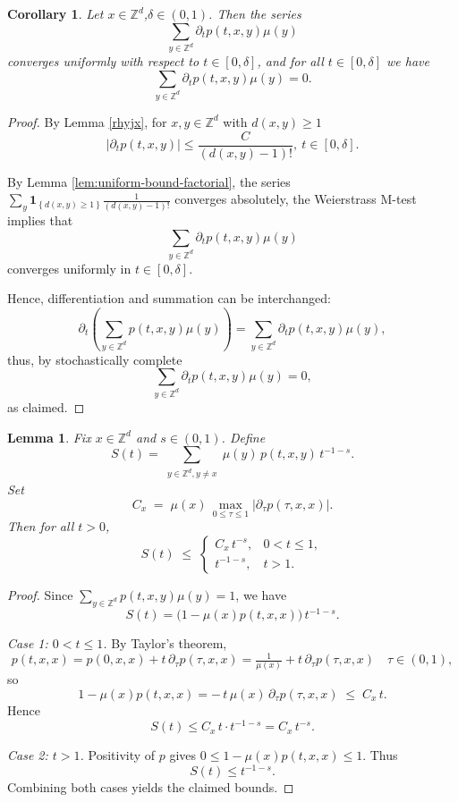 \documentclass[reqno,12pt]{amsart}
\numberwithin{equation}{section}
\newtheorem{lemma}[theorem]{Lemma}
\newtheorem{corollary}[theorem]{Corollary}
\begin{document}
\begin{corollary}\label{yzslj}
	Let \(x \in \mathbb{Z}^d\),$\delta\in (0,1)$. Then the series
	\[
	\sum_{y \in \mathbb{Z}^d} \partial_t p(t, x, y) \mu(y)
	\]
	converges uniformly with respect to \(t \in [0,\delta]\), and for all \(t \in [0,\delta]\) we have
	\[
	\sum_{y \in \mathbb{Z}^d} \partial_t p(t, x, y) \mu(y) = 0.
	\]
	
\end{corollary}


\begin{proof}
	By Lemma \ref{rhyjx}, for $x,y\in \mathbb{Z}^d$ with $d\left(x,y\right)\ge 1$
	\[
	\left| \partial_t p(t,x,y) \right| \leq \frac{C}{\left(d(x,y)-1\right)!}, \:t\in [0,\delta].
	\]
	
	By Lemma \ref{lem:uniform‐bound‐factorial}, the series \(\sum_{y} \mathbf{1}_{\left\{d\left(x,y\right)\ge 1\right\}} \frac{1}{\left(d(x,y)-1\right)!}\) converges absolutely, the Weierstrass M-test implies that
	\[
	\sum_{y\in \mathbb{Z}^d} \partial_t p(t,x,y) \mu(y)
	\]
	converges uniformly in \(t\in[0,\delta]\).
	
	Hence, differentiation and summation can be interchanged:
	\[
	\partial_t \left( \sum_{y\in\mathbb{Z}^d} p(t,x,y)\mu(y) \right) = \sum_{y\in\mathbb{Z}^d} \partial_t p(t,x,y)\mu(y),
	\]
thus, by stochastically complete
	\[
	\sum_{y\in\mathbb{Z}^d} \partial_t p(t,x,y) \mu(y) = 0,
	\]
	as claimed.
\end{proof}

\begin{lemma}\label{stupbound}
	Fix \(x\in\mathbb{Z}^d\) and \(s\in(0,1)\).  Define
	\[
	S(t)
	=\sum_{\substack{y\in\mathbb{Z}^d,y\neq x}}
	\mu(y)\,p(t,x,y)\,t^{-1-s}.
	\]
	Set
	\[
	C_x \;=\;\mu(x)\,\max_{0\le\tau\le1}\bigl|\partial_\tau p(\tau,x,x)\bigr|.
	\]
	Then for all \(t>0\),
	\[
	S(t)\;\le\;
	\begin{cases}
		C_x\,t^{-s}, &0<t\le1,\\
		t^{-1-s},    &t>1.
	\end{cases}
	\]
\end{lemma}

\begin{proof}
	Since \(\sum_{y\in\mathbb{Z}^d }p(t,x,y)\mu(y)=1\), we have
	\[
	S(t)
	=\bigl(1-\mu(x)p(t,x,x)\bigr)\,t^{-1-s}.
	\]
	
	\emph{Case 1: \(0<t\le1\).}  By Taylor’s theorem,
	\[
	p(t,x,x)
	=p(0,x,x)+t\,\partial_\tau p(\tau,x,x)
	=\tfrac1{\mu(x)}+t\,\partial_\tau p(\tau,x,x)
	\quad\tau\in(0,1),
	\]
	so
	\[
	1-\mu(x)p(t,x,x)
	=-\,t\,\mu(x)\,\partial_\tau p(\tau,x,x)
	\;\le\;C_x\,t.
	\]
	Hence
	\[
	S(t)
	\le C_x\,t\cdot t^{-1-s}
	=C_x\,t^{-s}.
	\]
	
	\emph{Case 2: \(t>1\).}  Positivity of \(p\) gives \(0\le1-\mu(x)p(t,x,x)\le1\).  Thus
	\[
	S(t)
	\le t^{-1-s}.
	\]
	Combining both cases yields the claimed bounds.
\end{proof}
\end{document}
